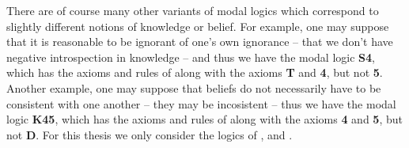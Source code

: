 There are of course many other variants of modal logics which correspond to
slightly different notions of knowledge or belief. For example, one may suppose
that it is reasonable to be ignorant of one's own ignorance -- that we don't
have negative introspection in knowledge -- and thus we have the modal logic
{\bf S4}, which has the axioms and rules of \axiomK{} along with the axioms {\bf
T} and {\bf 4}, but not {\bf 5}. Another example, one may suppose that beliefs
do not necessarily have to be consistent with one another -- they may be
incosistent -- thus we have the modal logic {\bf K45}, which has the axioms and
rules of \axiomK{} along with the axioms {\bf 4} and {\bf 5}, but not {\bf D}.
For this thesis we only consider the logics of \axiomK{}, \axiomKD{} and
\axiomS{}.
